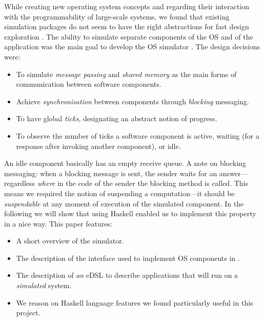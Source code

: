 While creating new operating system concepts and regarding their interaction with the programmability of large-scale systems, we found that existing simulation packages do not seem to have the right abstractions for fast design exploration \cite{cotson,omnet}.
The ability to simulate separate components of the OS and of the application was the main goal to develop the OS simulator \soosim \cite{Baaij:2012}.
The design decisions were:
\begin{itemize}
\item To simulate \emph{message passing} and \emph{shared memory} as the main forms of communication between software components.
\item Achieve \emph{synchronisation} between components through \emph{blocking} messaging.
\item To have global \emph{ticks}, designating an abstract notion of progress.
\item To observe the number of ticks a software component is active, waiting (for a response after invoking another component), or idle.
\end{itemize}
An idle component basically has an empty receive queue. 
A note on blocking messaging: when a blocking message is sent, the sender waits for an answer---regardless \emph{where} in the code of the sender the blocking  method is called.
This means we required the notion of suspending a computation---it should be \emph{suspendable} at any moment of execution of the simulated component.
In the following we will show that using Haskell \cite{haskell-report} 
enabled us to implement this property in a nice way.
This paper features:
\begin{itemize}
\item A short overview of the \soosim simulator.
\item The description of the interface used to implement OS components in \soosim.
\item The description of \emph{an} eDSL to describe applications that will run on a \soosim \emph{simulated} system.
\item We reason on Haskell language features we found particularly
  useful in this project. 
\end{itemize}
